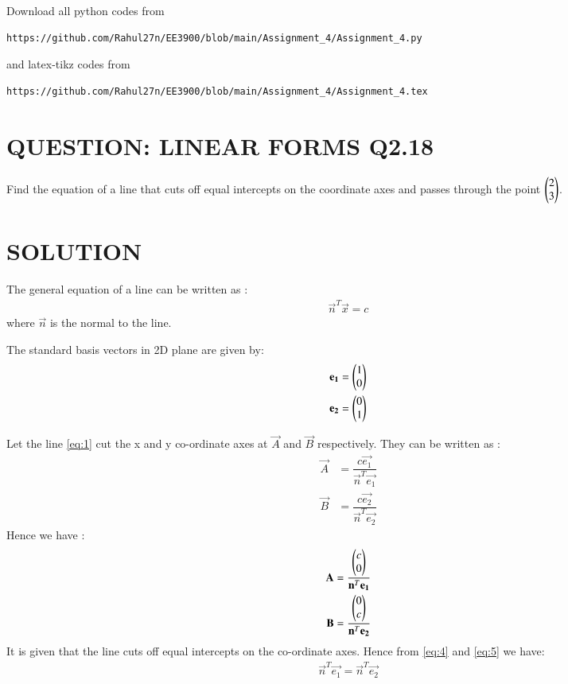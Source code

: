 \documentclass[journal,12pt,twocolumn]{IEEEtran}
\begin{document}
\maketitle
\newpage
\bigskip
\renewcommand{\thefigure}{\theenumi}
\renewcommand{\thetable}{\theenumi}
Download all python codes from 
\begin{lstlisting}
https://github.com/Rahul27n/EE3900/blob/main/Assignment_4/Assignment_4.py
\end{lstlisting}
%
and latex-tikz codes from 
%
\begin{lstlisting}
https://github.com/Rahul27n/EE3900/blob/main/Assignment_4/Assignment_4.tex
\end{lstlisting}
\vspace{0.5cm}
\section{QUESTION: LINEAR FORMS Q2.18}
Find the equation of a line that cuts off equal intercepts on the coordinate axes and passes through the point $\begin{pmatrix}2 \\ 3\end{pmatrix}$.
\section{SOLUTION}
The general equation of a line can be written as :
\begin{align}
\vec{n}^T\vec{x}=c \label{eq:1}  
\end{align}
where $\vec{n}$ is the normal to the line.

The standard basis vectors in 2D plane are given by:
\begin{align}
\mathbf{e_{1}} &= \begin{pmatrix}1 \\ 0\end{pmatrix}\label{eq:2}
\\\mathbf{e_{2}} &= \begin{pmatrix}0 \\ 1\end{pmatrix}\label{eq:3}
\end{align}

Let the line \eqref{eq:1} cut the x and y co-ordinate axes at $\vec{A}$ and $\vec{B}$ respectively. They can be written as :
\begin{align}
\vec{A} &= \dfrac{c\vec{e_{1}}}{\vec{n}^T\vec{e_{1}}}\\
\vec{B} &= \dfrac{c\vec{e_{2}}}{\vec{n}^T\vec{e_{2}}}
\end{align}
Hence we have :
\begin{align}
\mathbf{A} &= \dfrac{\begin{pmatrix}c \\ 0\end{pmatrix}}{\mathbf{n}^T\mathbf{e_{1}}}\label{eq:4}
\\\mathbf{B} &= \dfrac{\begin{pmatrix}0 \\ c\end{pmatrix}}{\mathbf{n}^T\mathbf{e_{2}}}\label{eq:5}
\end{align}
It is given that the line cuts off equal intercepts on the co-ordinate axes. Hence from \eqref{eq:4} and \eqref{eq:5} we have:
\begin{align}
\vec{n}^T\vec{e_{1}} = \vec{n}^T\vec{e_{2}}
\end{align}
\end{document}
